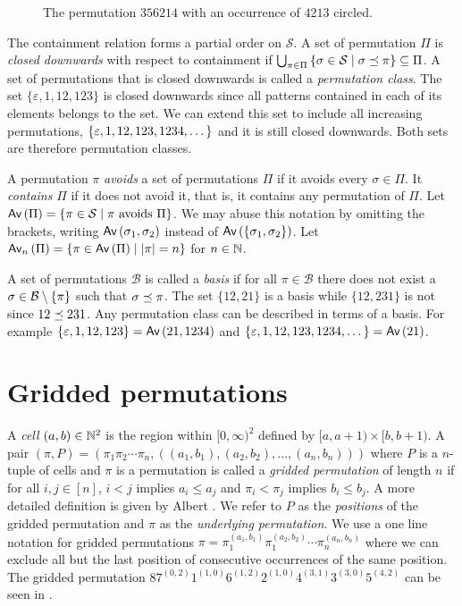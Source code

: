 \begin{figure}[ht!]
    \centering
    
    \caption{The permutation $356214$ with an occurrence of $4213$ circled.}
    \label{fig:pattern_containment}
\end{figure}

The containment relation forms a partial order on $\mathcal{S}$. A set of permutation $\Pi$ is \emph{closed downwards} with respect to containment if $\bigcup_{\pi \in \Pi}\cset{\sigma \in \mathcal{S}}{\contains{\pi}{\sigma}} \subseteq \Pi$. A set of permutations that is closed downwards is called a \emph{permutation class}. The set $\{\varepsilon, 1, 12, 123\}$ is closed downwards since all patterns contained in each of its elements belongs to the set. We can extend this set to include all increasing permutations, $\set{\varepsilon, 1, 12, 123, 1234, \dotsc}$ and it is still closed downwards. Both sets are therefore permutation classes.

A permutation $\pi$ \emph{avoids} a set of permutations $\Pi$ if it avoids every $\sigma \in \Pi$. It \emph{contains} $\Pi$ if it does not avoid it, that is, it contains any permutation of $\Pi$. Let $\Av{\Pi} = \cset{\pi \in \mathcal{S}}{\pi \text{ avoids } \Pi}$. We may abuse this notation by omitting the brackets, writing $\Av{\sigma_1,\sigma_2}$ instead of $\Av{\set{\sigma_1,\sigma_2}}$. Let $\textsf{Av}_n\left(\Pi\right) = \cset{\pi \in \Av{\Pi}}{|\pi| = n}$ for $n\in\N$.

A set of permutations $\mathcal{B}$ is called a \emph{basis} if for all $\pi\in\mathcal{B}$ there does not exist a $\sigma \in \mathcal{B} \setminus \set{\pi}$ such that $\contains{\pi}{\sigma}$. The set $\{12,21\}$ is a basis while $\{12,231\}$ is not since $\contains{231}{12}$. Any permutation class can be described in terms of a basis. For example $\{\varepsilon,1,12,123\} = \Av{21, 1234}$ and $\{\varepsilon, 1, 12, 123, 1234,\dotsc\} = \Av{21}$.


\section{Gridded permutations\label{sec:griddedpermutations}}
A \emph{cell} $(a,b) \in \N^2$ is the region within $[0,\infty)^2$ defined by $[a, a+1) \times [b, b+1).$ A pair $(\pi,P) = (\pi_1\pi_2\dotsb\pi_n, ((a_1,b_1),(a_2,b_2),\dotsc,(a_n,b_n)))$ where $P$ is a $n$-tuple of cells and $\pi$ is a permutation is called a \emph{gridded permutation} of length $n$ if for all $i,j \in [n]$, $i<j$ implies $a_i \leq a_j$ and $\pi_i < \pi_j$ implies $b_i \leq b_j$. A more detailed definition is given by Albert \cite{albert2012geometric}. We refer to $P$ as the \emph{positions} of the gridded permutation and $\pi$ as the \emph{underlying permutation}. We use a one line notation for gridded permutations $\pi = \pi_1^{(a_1,b_1)}\pi_1^{(a_2,b_2)}\dotsb\pi_n^{(a_n,b_n)}$ where we can exclude all but the last position of consecutive occurrences of the same position. The gridded permutation $87^{(0,2)}1^{(1,0)}6^{(1,2)}2^{(1,0)}4^{(3,1)}3^{(3,0)}5^{(4,2)}$ can be seen in .

